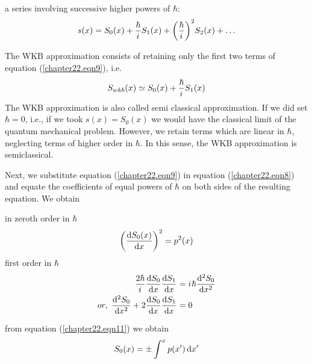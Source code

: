 a series involving successive higher powers of $\hbar$:
\begin{equation}
\label{chapter22.eqn9}
	s(x) = S_0(x) + \frac{\hbar}{{i\mkern1mu}} S_1(x) + \qty(\frac{\hbar}{{i\mkern1mu}})^{2} S_2(x) + \ldots
\end{equation}

The WKB approximation consists of retaining only the first two terms of equation (\ref{chapter22.eqn9}), i.e.
\begin{equation}
\label{chapter22.eqn10}
S_{wkb}(x) \simeq S_0(x) + \frac{\hbar}{{i\mkern1mu}} S_1(x)
\end{equation}
The WKB approximation is also called semi classical approximation. If we did set $\hbar=0$, i.e., if we took $s(x) = S_0(x)$ we would have the classical limit of the quantum mechanical problem. However, we retain terms which are linear in $\hbar$, neglecting terms of higher order in $\hbar$. In this sense, the WKB approximation is semiclassical.

Next, we substitute equation (\ref{chapter22.eqn9}) in equation (\ref{chapter22.eqn8}) and equate the coefficients of equal powers of $\hbar$ on both sides of the resulting equation. We obtain

in zeroth order in $\hbar$
\begin{equation}
\label{chapter22.eqn11}
\qty(\dv{S_0(x)}{x})^2 = p^2(x)
\end{equation}
first order in $\hbar$
\begin{align}
	\frac{2 \hbar}{\iu} \dv{S_0}{x} \dv{S_1}{x} &= \iu \hbar \dv[2]{S_0}{x} \nonumber \\
	or, \ 
	\label{chapter22.eqn12}
	\dv[2]{S_0}{x} + 2 \dv{S_0}{x} \dv{S_1}{x} &= 0 
\end{align}

from equation (\ref{chapter22.eqn11}) we obtain
\begin{equation}
\label{chapter22.eqn13}
S_0\qty(x) = \pm \int^{x} p(x^\prime) \dd{x^\prime}
\end{equation}

